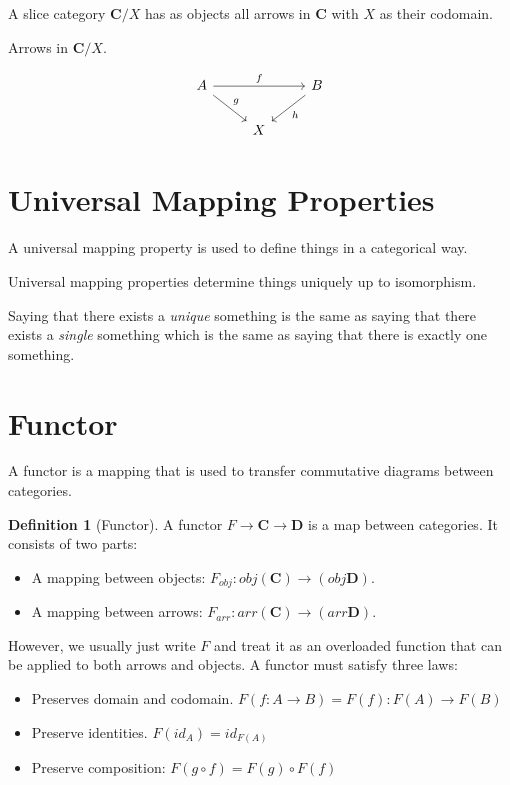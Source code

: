 \documentclass{book}
\theoremstyle{definition}
\newtheorem{definition}{Definition}[section]
\newcommand\id{\mathit{id}}
\begin{document}
A slice category $\mathbf{C}/X$ has as objects all arrows in \textbf{C} with $X$
as their codomain.

Arrows in $\mathbf{C}/X$.

\[
  \begin{tikzcd}
    A \ar[rr, "f"] \ar[dr, "g"] & & B \ar[dl, "h"] \\
    & X
  \end{tikzcd}
\]

\section{Universal Mapping Properties}

A universal mapping property is used to define things in a categorical way.

Universal mapping properties determine things uniquely up to isomorphism.

Saying that there exists a \emph{unique} something is the same as saying that
there exists a \emph{single} something which is the same as saying that there is
exactly one something.

\section{Functor}

A functor is a mapping that is used to transfer commutative diagrams between
categories.

\begin{definition}[Functor]
  A functor $F \to \mathbf{C} \to \mathbf{D}$ is a map between categories. It
  consists of two parts:
  \begin{itemize}
  \item A mapping between objects:
    $F_{obj} : obj(\mathbf{C}) \to (obj\mathbf{D})$.
  \item A mapping between arrows:
    $F_{arr} : arr(\mathbf{C}) \to (arr\mathbf{D})$.
  \end{itemize}
  However, we usually just write $F$ and treat it as an overloaded function that
  can be applied to both arrows and objects. A functor must satisfy three laws:
  \begin{itemize}
  \item Preserves domain and codomain. $F(f : A \to B) = F(f) : F(A) \to F(B)$
  \item Preserve identities. $F(\id_A) = \id_{F(A)}$
  \item Preserve composition: $F(g \circ f) = F(g) \circ F(f)$
  \end{itemize}
\end{definition}
\end{document}
